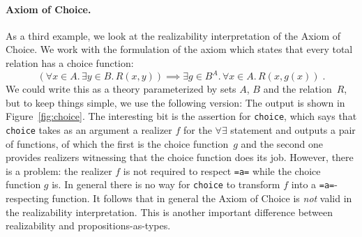 \begin{figure*}
  \centering
  {\small{}}
  \caption{Output for theories \texttt{Iteration} and \texttt{Nat}}
  \label{fig:nat}
\end{figure*}

\paragraph{Axiom of Choice.}
\label{sec:axiom-choice}

As a third example, we look at the realizability interpretation of the
Axiom of Choice. We work with the formulation of the axiom which
states that every total relation has a choice function:
%
\[
  (\forall x \in A.\,
   \exists y \in B.\, R(x, y)) \implies %
  \exists g \in B^A.\,
  \forall x \in A.\, R(x, g(x)) \;.
\]
%
We could write this as a theory parameterized by sets $A$, $B$ and the
relation~$R$, but to keep things simple, we use the following version:
%
{\small{}}%
%
The output is shown in Figure~\ref{fig:choice}. The interesting bit is
the assertion for \Verb|choice|, which says that \Verb|choice| takes
as an argument a realizer $f$ for the $\forall\exists$ statement and
outputs a pair of functions, of which the first is the choice
function~$g$ and the second one provides realizers witnessing that the
choice function does its job. However, there is a problem: the
realizer $f$ is not required to respect \Verb|=a=| while the choice
function $g$ is. In general there is no way for \Verb|choice| to
transform $f$ into a \Verb|=a=|-respecting function. It follows that
in general the Axiom of Choice is \emph{not} valid in the
realizability interpretation. This is another important difference
between realizability and propositions-as-types.

\begin{figure*}
  \centering
  {\small {}}
  \caption{Output for theory \texttt{Choice}}
  \label{fig:choice}
\end{figure*}


